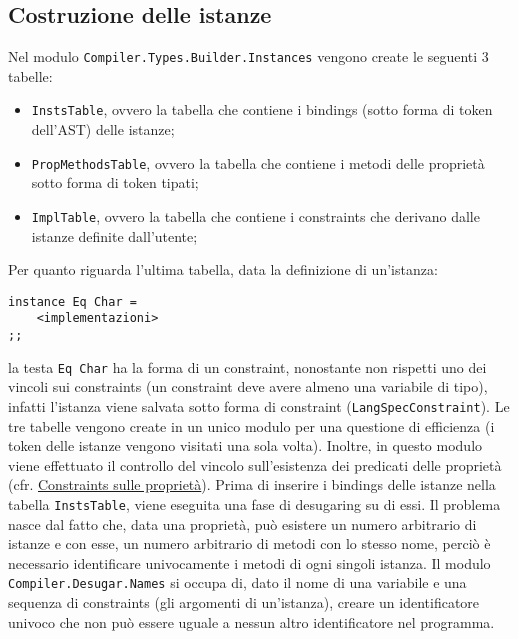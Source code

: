 \documentclass[10pt,a4paper]{article}
\begin{document}
\hypertarget{Costruzione delle istanze}{\subsection{Costruzione delle istanze}}
Nel modulo \texttt{Compiler.Types.Builder.Instances} vengono create le seguenti 3 tabelle:
\begin{itemize}
    \item \texttt{InstsTable}, ovvero la tabella che contiene i bindings (sotto forma di token dell'AST) delle istanze;
    \item \texttt{PropMethodsTable}, ovvero la tabella che contiene i metodi delle proprietà sotto forma di token
    tipati;
    \item \texttt{ImplTable}, ovvero la tabella che contiene i constraints che derivano dalle istanze definite
    dall'utente;
\end{itemize}
Per quanto riguarda l'ultima tabella, data la definizione di un'istanza:
\begin{lstlisting}
instance Eq Char =
    <implementazioni>
;;
\end{lstlisting}
la testa \texttt{Eq Char} ha la forma di un constraint, nonostante non rispetti uno dei vincoli sui constraints (un
constraint deve avere almeno una variabile di tipo), infatti l'istanza viene salvata sotto forma di constraint
(\texttt{LangSpecConstraint}).
Le tre tabelle vengono create in un unico modulo per una questione di efficienza (i token delle istanze vengono visitati
una sola volta). Inoltre, in questo
modulo viene effettuato il controllo del vincolo sull'esistenza dei predicati delle proprietà (cfr.
\hyperlink{Constraints sulle proprietà}{Constraints sulle proprietà}). Prima di inserire i bindings delle istanze nella
tabella \texttt{InstsTable}, viene eseguita una fase di desugaring su di essi. Il problema nasce dal fatto che, data
una proprietà, può esistere un numero arbitrario di istanze e con esse, un numero arbitrario di metodi con lo stesso
nome, perciò è necessario identificare univocamente i metodi di ogni singoli istanza. Il modulo
\texttt{Compiler.Desugar.Names} si occupa di, dato il nome di una variabile e una sequenza di constraints (gli argomenti
di un'istanza), creare un identificatore univoco che non può essere uguale a nessun altro identificatore nel programma.
\end{document}
